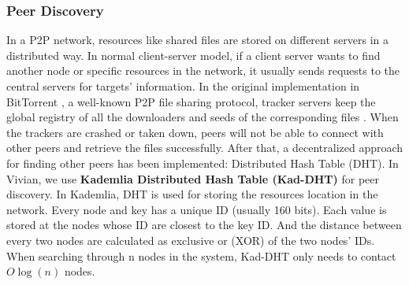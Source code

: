 \subsubsection{Peer Discovery}
In a P2P network, resources like shared files are stored on different servers in a distributed way.
In normal client-server model, if a client server wants to find another node or specific resources in the network, it usually sends requests to the central servers for targets' information.
In the original implementation in BitTorrent \cite{bram_2008}, a well-known P2P file sharing protocol, tracker servers keep the global registry of all the downloaders and seeds of the corresponding files \cite{pouwelse2005bittorrent}.
When the trackers are crashed or taken down, peers will not be able to connect with other peers and retrieve the files successfully. After that, a decentralized approach for finding other peers has been implemented: Distributed Hash Table (DHT).
In Vivian, we use \textbf{Kademlia Distributed Hash Table (Kad-DHT)} \cite{maymounkov2002kademlia} for peer discovery. In Kademlia, DHT is used for storing the resources location in the network. Every node and key has a unique ID (usually 160 bits).
Each value is stored at the nodes whose ID are closest to the key ID. And the distance between every two nodes are calculated as exclusive or (XOR) of the two nodes' IDs.
When searching through n nodes in the system, Kad-DHT only needs to contact $O\log (n)$ nodes.

